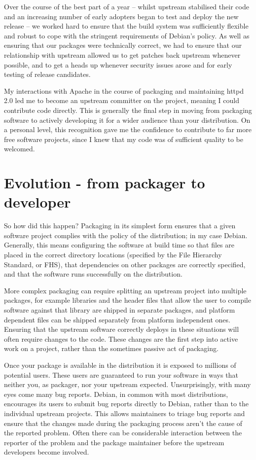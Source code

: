 Over the course of the best part of a year -- whilst upstream stabilised their code and an increasing number of early adopters began to test and deploy the new release -- we worked hard to ensure that the build system was sufficiently flexible and robust to cope with the stringent requirements of Debian's policy. As well as ensuring that our packages were technically correct, we had to ensure that our relationship with upstream allowed us to get patches back upstream whenever possible, and to get a heads up whenever security issues arose and for early testing of release candidates. 

My interactions with Apache in the course of packaging and maintaining httpd 2.0 led me to become an upstream committer on the project, meaning I could contribute code directly. This is generally the final step in moving from packaging software to actively developing it for a wider audience than your distribution. On a personal level, this recognition gave me the confidence to contribute
to far more free software projects, since I knew that my code was of sufficient quality to be welcomed. 

\section*{Evolution - from packager to developer}
So how did this happen? Packaging in its simplest form ensures that a given software project complies with the policy of the distribution; in my case Debian. Generally, this means configuring the software at build time so that files are placed in the correct directory locations (specified by the File Hierarchy Standard, or FHS), that dependencies on other packages are correctly specified,
 and that the software runs successfully on the distribution. 

More complex packaging can require splitting an upstream project into multiple packages, for example libraries and the header files that allow the user to compile software against that library are shipped in separate packages, and platform dependent files can be shipped separately from platform independent ones. Ensuring that 
the upstream software correctly deploys in these situations will often require changes to the code. These changes are the first step into active work on a project, rather than the sometimes passive act of packaging. 

Once your package is available in the distribution it is exposed to millions of potential users. These users are guaranteed to run your software in ways that neither you, as packager, nor your upstream expected. Unsurprisingly, with many eyes come many bug reports. Debian, in common with most distributions, encourages its users to submit bug reports directly to Debian, rather than to 
the individual upstream projects. This allows maintainers to triage bug reports and ensure that the changes made during the packaging process aren't the cause of the reported problem. Often there can be considerable interaction between the reporter of the problem and the package maintainer before the upstream developers become involved.

